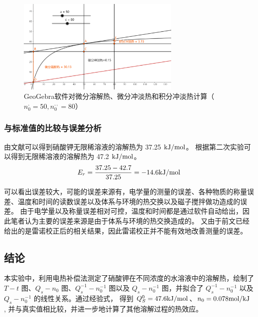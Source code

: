 \documentclass[cn,hazy,pku,12pt,normal,math=newtx,cite=super]{elegantnote}
\begin{document}
\begin{figure}[htbp]
    \centering
    \includegraphics[width = 0.70\textwidth]{image/ggb.png}
    \caption{GeoGebra软件对微分溶解热、微分冲淡热和积分冲淡热计算（$n_0^,=50, n_0^{,,}=80$）}\label{10}
\end{figure}

\subsubsection{与标准值的比较与误差分析}

由文献\cite{dk}可以得到硝酸钾无限稀溶液的溶解热为 37.25 $\rm kJ/mol$。
根据第二次实验可以得到无限稀溶液的溶解热为 47.2 $\rm kJ/mol$。
$$
E_r = \frac{37.25 - 42.7}{37.25} =  - 14.6 {\rm kJ/mol}
$$

可以看出误差较大，可能的误差来源有，电学量的测量的误差、各种物质的称量误差、温度和时间的读数误差以及体系与环境的热交换以及磁子搅拌做功造成的误差。
由于电学量以及称量误差相对可控，温度和时间都是通过软件自动给出，因此笔者认为主要的误差来源是由于体系与环境的热交换造成的。
又由于前文已经给出的是雷诺校正后的相关结果，因此雷诺校正并不能有效地改善测量的误差。


\subsection{结论}
本实验中，利用电热补偿法测定了硝酸钾在不同浓度的水溶液中的溶解热，绘制了 $T-t$ 图、$Q_s-n_0$ 图、$Q_s^{-1}-n_0^{-1}$ 图以及 $Q_s-n_0^{-1}$ 图，并拟合了 $Q_s^{-1}-n_0^{-1}$ 以及 $Q_s-n_0^{-1}$ 的线性关系。通过经验式，
得到 $Q_S^0 = 47.6 {\rm kJ/mol} $、$
n_0  = 0.078 {\rm mol/kJ}$
, 并与真实值相比较，并进一步地计算了其他溶解过程的热效应。

\nocite{*}

\end{document}

